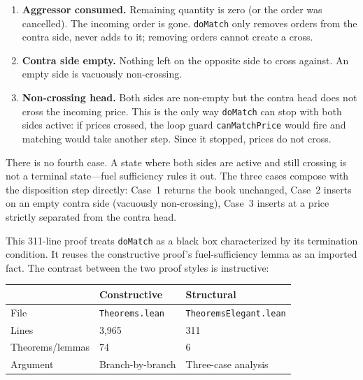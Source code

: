 \documentclass[11pt,a4paper]{article}
\begin{document}
\begin{enumerate}[nosep]
\item \textbf{Aggressor consumed.} Remaining quantity is zero (or the
      order was cancelled). The incoming order is gone.
      \texttt{doMatch} only removes orders from the contra side, never
      adds to it; removing orders cannot create a cross.

\item \textbf{Contra side empty.} Nothing left on the opposite side to
      cross against. An empty side is vacuously non-crossing.

\item \textbf{Non-crossing head.} Both sides are non-empty but the
      contra head does not cross the incoming price. This is the only
      way \texttt{doMatch} can stop with both sides active: if prices
      crossed, the loop guard \texttt{canMatchPrice} would fire and
      matching would take another step. Since it stopped, prices do not
      cross.
\end{enumerate}

There is no fourth case. A state where both sides are active and still
crossing is not a terminal state---fuel sufficiency rules it out. The
three cases compose with the disposition step directly: Case~1 returns
the book unchanged, Case~2 inserts on an empty contra side (vacuously
non-crossing), Case~3 inserts at a price strictly separated from the
contra head.

This 311-line proof treats \texttt{doMatch} as a black box
characterized by its termination condition. It reuses the constructive
proof's fuel-sufficiency lemma as an imported fact. The contrast
between the two proof styles is instructive:

\begin{center}
\small
\begin{tabular}{@{}lll@{}}
\toprule
                        & Constructive              & Structural              \\
\midrule
File                    & \texttt{Theorems.lean}    & \texttt{TheoremsElegant.lean} \\
Lines                   & 3{,}965                   & 311                     \\
Theorems/lemmas         & 74                        & 6                       \\
Argument                & Branch-by-branch          & Three-case analysis     \\
\bottomrule
\end{tabular}
\end{center}
\end{document}
